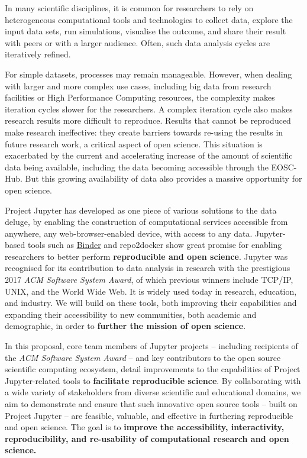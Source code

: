 

\begin{draft}

In many scientific disciplines, it is common for researchers to rely on
heterogeneous computational tools and technologies to collect data, explore the
input data sets, run simulations, visualise the outcome, and share their result
with peers or with a larger audience. Often, such data analysis cycles are
iteratively refined.

For simple datasets, processes may remain manageable. However, when dealing with
larger and more complex use cases, including big data from research facilities
or High Performance Computing resources, the complexity makes iteration cycles
slower for the researchers. A complex iteration cycle also makes research
results more difficult to reproduce. Results that cannot be reproduced make
research ineffective: they create barriers towards re-using the results in
future research work, a critical aspect of open science. This situation is
exacerbated by the current and accelerating increase of the amount of scientific
data being available, including the data becoming accessible through the
EOSC-Hub. But this growing availability of data also provides a massive
opportunity for open science.

Project Jupyter has developed as one piece of various solutions to the data
deluge, by enabling the construction of computational services accessible from
anywhere, any web-browser-enabled device, with access to any data. Jupyter-based
tools such as \href{https://mybinder.org}{Binder} and repo2docker show great
promise for enabling researchers to better perform \textbf{reproducible and open
  science}. Jupyter was recognised for its contribution to data analysis in
research with the prestigious 2017 \emph{ACM Software System Award}, of which
previous winners include TCP/IP, UNIX, and the World Wide Web. It is widely used
today in research, education, and industry. We will build on these tools, both
improving their capabilities and expanding their accessibility to new
communities, both academic and demographic, in order to \textbf{further the
  mission of open science}.

In this proposal, core team members of Jupyter projects -- including
recipients of the \emph{ACM Software System Award} -- and key contributors to
the open source scientific computing ecosystem, detail improvements to the
capabilities of Project Jupyter-related tools to \textbf{facilitate reproducible science}.
By collaborating with a wide variety
of stakeholders from diverse scientific and educational domains, we aim to
demonstrate and ensure that such innovative open source tools -- built on Project
Jupyter -- are feasible, valuable, and effective in furthering reproducible and open science. The
goal is to \textbf{improve the accessibility, interactivity,
  reproducibility, and re-usability of computational research and open science.}

\end{draft}

\draftpage

